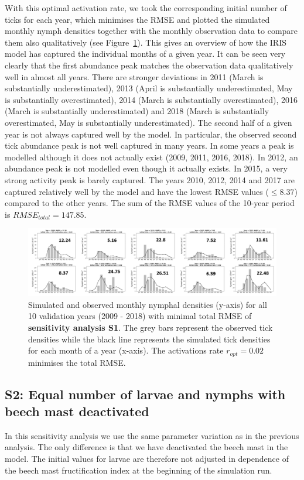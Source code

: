 \documentclass[a4paper, 11pt]{scrartcl}
\begin{document}
With this optimal activation rate, we took the corresponding initial number of ticks for each year, which minimises the RMSE and plotted the simulated monthly nymph densities
together with the monthly observation data to compare them also qualitatively (see Figure~\ref{fig:initial_ticks_with_beech}). This gives an overview of how the IRIS model
has captured the individual months of a given year. It can be seen very clearly that the first abundance peak matches the observation data qualitatively well in almost all years.
There are stronger deviations in 2011 (March is substantially underestimated), 2013 (April is substantially underestimated, May is substantially overestimated), 2014 (March is
substantially overestimated), 2016 (March is substantially underestimated) and 2018 (March is substantially overestimated, May is substantially underestimated). The second half
of a given year is not always captured well by the model. In particular, the observed second tick abundance peak is not well captured in many years. In some years a peak is
modelled although it does not actually exist (2009, 2011, 2016, 2018). In 2012, an abundance peak is not modelled even though it actually exists. In 2015, a very strong activity
peak is barely captured. The years 2010, 2012, 2014 and 2017 are captured relatively well by the model and have the lowest RMSE values ($\leq 8.37$) compared to the other years.
The sum of the RMSE values of the 10-year period is $RMSE_{total} = 147.85$.

\begin{figure}[h!]
\centering
\includegraphics[width=\linewidth]{figures/initial_ticks_with_beech}
\caption{Simulated and observed monthly nymphal densities (y-axis) for all 10 validation years (2009 - 2018) with minimal total RMSE of \textbf{sensitivity analysis S1}. The grey
bars represent the observed tick densities while the black line represents the simulated tick densities for each month of a year (x-axis). The activations rate $r_{opt} = 0.02$
minimises the total RMSE.}
\label{fig:initial_ticks_with_beech}
\end{figure}


\subsection{S2: Equal number of larvae and nymphs with beech mast deactivated}
In this sensitivity analysis we use the same parameter variation as in the previous analysis. The only difference is that we have deactivated the beech mast in the model. The
initial values for larvae are therefore not adjusted in dependence of the beech mast fructification index at the beginning of the simulation run.
\end{document}
